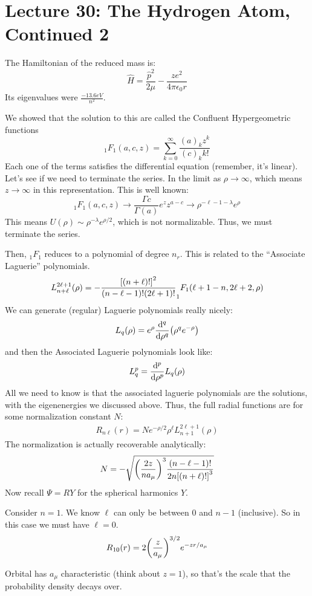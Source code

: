 \section{Lecture 30: The Hydrogen Atom, Continued 2}

The Hamiltonian of the reduced mass is:
\[ \hat{H} = \frac{\hat{p}^2}{2\mu} - \frac{ze^2}{4 \pi \epsilon_0 r} \]
Its eigenvalues were $\frac{-13.6 eV}{n^2}$.

We showed that the solution to this are called the Confluent Hypergeometric functions 
\[ _1F_1(a, c, z) = \sum_{k = 0}^{\infty} \frac{(a)_k z^k}{(c)_k k!}\]
Each one of the terms satisfies the differential equation (remember, it's linear). Let's see if
we need to terminate the series. In the limit as $\rho \to \infty$, which means $z \to \infty$ in this representation.
This is well known:
\[ _1F_1(a, c, z) \to \frac{\Gamma{c}}{\Gamma(a)} e^z z^{a - c} \to \rho^{-\ell - 1 - \lambda} e^{\rho} \]
This means $U(\rho) \sim \rho^{-\lambda} e^{\rho/2}$, which is not normalizable. Thus, we must terminate the series.

Then, $_1F_1$ reduces to a polynomial of degree $n_r$. This is related to the ``Associate Laguerie'' polynomials.
\[ L_{n + \ell}^{2\ell + 1}(\rho) = - \frac{\qty[(n + \ell)!]^2}{(n - \ell - 1)! (2\ell + 1)!} _1F_1(\ell + 1 - n, 2\ell + 2, \rho) \]
We can generate (regular) Laguerie polynomials really nicely:
\[ L_q(\rho) = e^{\rho} \dv{^q}{\rho^q} \qty(\rho^q e^{-\rho}) \]
and then the Associated Laguerie polynomials look like:
\[ L_q^p = \dv{^p}{\rho^p} L_q(\rho) \]
All we need to know is that the associated laguerie polynomials are the solutions, with the eigenenergies we discussed above.
Thus, the full radial functions are for some normalization constant $N$:
\begin{align*}
    R_{n \ell}(r) = N e^{-\rho/2} \rho^{\ell} L_{n + 1}^{2\ell + 1}(\rho)
\end{align*}
The normalization is actually recoverable analytically:
\[ N = - \sqrt{\qty(\frac{2z}{n a_{\mu}})^3 \frac{(n - \ell - 1)!}{2n \qty[(n + \ell)!]^3}} \]
Now recall $\Psi = RY$ for the spherical harmonics $Y$. 

Consider $n = 1$. We know $\ell$ can only be between $0$ and $n - 1$ (inclusive). So in this case we must have $\ell = 0$.
\[ R_{10}(r) = 2 \qty(\frac{z}{a_{\mu}})^{3/2} e^{-zr/{a_{\mu}}} \]

Orbital has $a_{\mu}$ characteristic (think about $z = 1$), so that's the scale that the probability density decays over.

